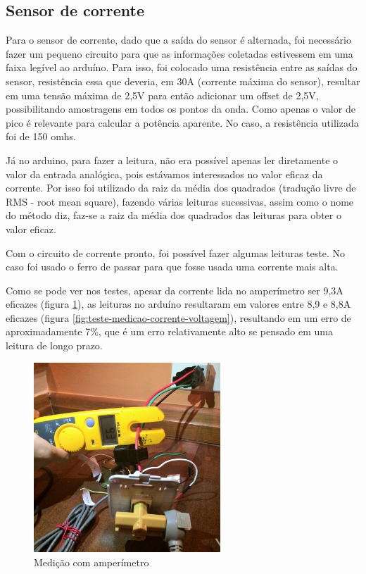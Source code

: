 \subsection{Sensor de corrente}

Para o sensor de corrente, dado que a saída do sensor é alternada, foi necessário fazer um pequeno circuito para que as informações coletadas estivessem em uma faixa legível ao arduíno. Para isso, foi colocado uma resistência entre as saídas do sensor, resistência essa que deveria, em 30A (corrente máxima do sensor), resultar em uma tensão máxima de 2,5V para então adicionar um offset de 2,5V, possibilitando amostragens em todos os pontos da onda. Como apenas o valor de pico é relevante para calcular a potência aparente.
No caso, a resistência utilizada foi de 150 omhs. 

Já no arduino, para fazer a leitura, não era possível apenas ler diretamente o valor da entrada analógica, pois estávamos interessados no valor eficaz da corrente. Por isso foi utilizado da raiz da média dos quadrados (tradução livre de RMS - root mean square), fazendo várias leituras sucessivas, assim como o nome do método diz, faz-se a raiz da média dos quadrados das leituras para obter o valor eficaz.

Com o circuito de corrente pronto, foi possível fazer algumas leituras teste. No caso foi usado o ferro de passar para que fosse usada uma corrente mais alta. 

Como se pode ver nos testes, apesar da corrente lida no amperímetro ser 9,3A eficazes (figura \ref{fig:teste-amperimetro}), as leituras no arduíno resultaram em valores entre 8,9 e 8,8A eficazes (figura \ref{fig:teste-medicao-corrente-voltagem}), resultando em um erro de aproximadamente 7\%, que é um erro relativamente alto se pensado em uma leitura de longo prazo.

\begin{figure}[H]
\centering
\includegraphics[width=7cm,keepaspectratio]{figuras/ferro-passar-amp.jpg} 
\caption{\label{fig:teste-amperimetro} Medição com amperímetro}
\end{figure}

